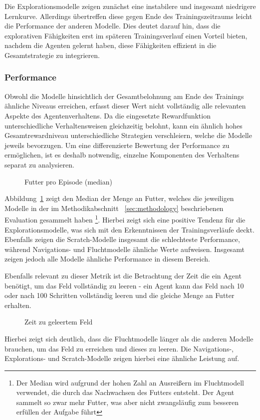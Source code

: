 Die Explorationsmodelle zeigen zunächst eine instabilere und insgesamt niedrigere Lernkurve. Allerdings übertreffen diese gegen Ende des Trainingszeitraums leicht die Performance der anderen Modelle. Dies deutet darauf hin, dass die explorativen Fähigkeiten erst im späteren Trainingsverlauf einen Vorteil bieten, nachdem die Agenten gelernt haben, diese Fähigkeiten effizient in die Gesamtstrategie zu integrieren.


\subsubsection{Performance}
Obwohl die Modelle hinsichtlich der Gesamtbelohnung am Ende des Trainings ähnliche Niveaus erreichen, erfasst dieser Wert nicht vollständig alle relevanten Aspekte des Agentenverhaltens. Da die eingesetzte Rewardfunktion unterschiedliche Verhaltensweisen gleichzeitig belohnt, kann ein ähnlich hohes Gesamtrewardniveau unterschiedliche Strategien verschleiern, welche die Modelle jeweils bevorzugen. Um eine differenzierte Bewertung der Performance zu ermöglichen, ist es deshalb notwendig, einzelne Komponenten des Verhaltens separat zu analysieren.
\begin{figure}[htbp]
  \centering
  \caption{Futter pro Episode (median)}
  \label{fig:food_per_episode}
\end{figure}
Abbildung~\ref{fig:food_per_episode} zeigt den Median der Menge an Futter, welches die jeweiligen Modelle in der im Methodikabschnitt ~\ref{sec:methodology} beschriebenen Evaluation gesammelt haben \footnote{Der Median wird aufgrund der hohen Zahl an Ausreißern im Fluchtmodell verwendet, die durch das Nachwachsen des Futters entsteht. Der Agent sammelt so zwar mehr Futter, was aber nicht zwangsläufig zum besseren erfüllen der Aufgabe führt}. Hierbei zeigt sich eine positive Tendenz für die Explorationsmodelle, was sich mit den Erkenntnissen der Trainingsverläufe deckt. Ebenfalls zeigen die Scratch-Modelle insgesamt die schlechteste Performance, während Navigations- und Fluchtmodelle ähnliche Werte aufweisen. Insgesamt zeigen jedoch alle Modelle ähnliche Performance in diesem Bereich.
\newpage

Ebenfalls relevant zu dieser Metrik ist die Betrachtung der Zeit die ein Agent benötigt, um das Feld vollständig zu leeren - ein Agent kann das Feld nach 10 oder nach 100 Schritten vollständig leeren und die gleiche Menge an Futter erhalten.
\begin{figure}[htbp]
  \centering
  \caption{Zeit zu geleertem Feld}
  \label{fig:time_to_goal}
\end{figure}
Hierbei zeigt sich deutlich, dass die Fluchtmodelle länger als die anderen Modelle brauchen, um das Feld zu erreichen und dieses zu leeren. Die Navigations-, Explorations- und Scratch-Modelle zeigen hierbei eine ähnliche Leistung auf.

